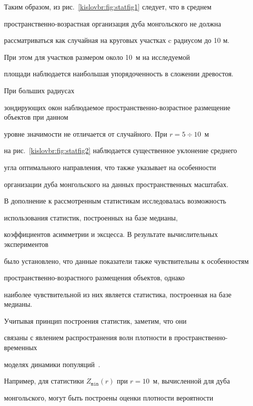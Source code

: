 Таким образом, из рис.~\ref{kislovbr:fig:statfig1}  следует, что в среднем 

про\-стран\-ствен\-но-воз\-раст\-ная организация дуба монгольского не должна

рассматриваться как случайная на  круговых участках c радиусом до 10 м.

При этом для участков размером около 10~м на исследуемой

площади наблюдается наибольшая упорядоченность в сложении древостоя. 

При больших радиусах 

зондирующих окон наблюдаемое про\-стран\-ствен\-но-воз\-раст\-ное размещение объектов при данном

уровне значимости не отличается от случайного. При $r=5\div10$~м 

на рис.~\ref{kislovbr:fig:statfig2} наблюдается существенное уклонение среднего 

угла оптимального направления, что также указывает на особенности 

организации дуба монгольского на данных  пространственных масштабах. 



В дополнение к рассмотренным статистикам  исследовалась возможность 

использования статистик, построенных на базе медианы, 

коэффициентов асимметрии и эксцесса.  В результате вычислительных экспериментов 

было установлено, что данные показатели также чувствительны к  особенностям

про\-стран\-ствен\-но-воз\-раст\-ного размещения объектов, однако 

наиболее чувствительной из них является статистика, построенная на базе медианы.



Учитывая принцип построения статистик, заметим, что они 

связаны с явлением распространения волн плотности в про\-стран\-ствен\-но-вре\-мен\-ных

моделях динамики популяций~\cite{kislovbr:bib:kolmogorov,kislovbr:bib:sviregev}. 

Например, для статистики $Z_{\texttt{min}}(r)$ при \linebreak \mbox{$r=10$ м}, вычисленной для дуба

монгольского, могут быть построены оценки плотности вероятности

